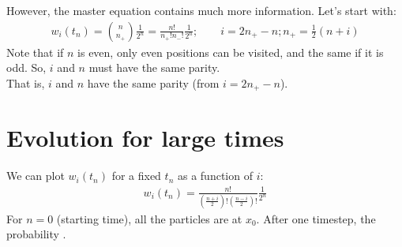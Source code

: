 \documentclass[../template.tex]{subfiles}
\begin{document}
However, the master equation contains much more information. Let's start with: 
\begin{align*}
    w_i(t_n) = {n \choose n_+} \frac{1}{2^n} = \frac{n!}{n_+! n_-!} \frac{1}{2^n}; \qquad i=2n_+ - n; n_+ = \frac{1}{2}(n+i)
\end{align*}
Note that if $n$ is even, only even positions can be visited, and the same if it is odd. So, $i$ and $n$ must have the same parity.\\
That is, $i$ and $n$ have the same parity (from $i = 2n_+ - n$).\\  

\section{Evolution for large times}
We can plot $w_i(t_n)$ for a fixed $t_n$ as a function of $i$:
\begin{align*}
    w_i(t_n) = \frac{n!}{\left(\frac{n+i}{2}\right)! \left(\frac{n-i}{2}\right)!} \frac{1}{2^n}
\end{align*}   
For $n=0$ (starting time), all the particles are at $x_0 $. After one timestep, the probability . %
\end{document}
